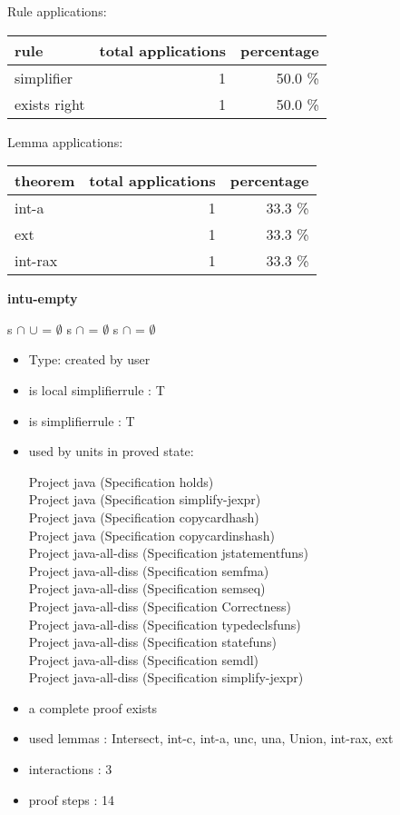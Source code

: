 \documentclass[a4paper]{article}
\begin{document}
Rule applications:

\begin{supertabular}{l|r|r}
rule	        & total applications & percentage \\ \hline
simplifier & 1 & 50.0 \% \\
exists right & 1 & 50.0 \% \\

\end{supertabular}

Lemma applications:

\begin{supertabular}{l|r|r}
theorem	        & total applications & percentage \\ \hline
int-a & 1 & 33.3 \% \\
ext & 1 & 33.3 \% \\
int-rax & 1 & 33.3 \% \\

\end{supertabular}
\pagebreak

{\LARGE\bf intu-empty}\label{lemma-intu-empty}

\medskip

 \Fol s $\cap$  $\cup$  = $\emptyset$ \Equiv s $\cap$  = $\emptyset$ \And s $\cap$  = $\emptyset$

\begin{itemize}

\item Type: created by user

\item is local simplifierrule : T
\item is simplifierrule : T
\item used by units in proved state:

Project java (Specification holds) \\
Project java (Specification simplify-jexpr) \\
Project java (Specification copycardhash) \\
Project java (Specification copycardinshash) \\
Project java-all-diss (Specification jstatementfuns) \\
Project java-all-diss (Specification semfma) \\
Project java-all-diss (Specification semseq) \\
Project java-all-diss (Specification Correctness) \\
Project java-all-diss (Specification typedeclsfuns) \\
Project java-all-diss (Specification statefuns) \\
Project java-all-diss (Specification semdl) \\
Project java-all-diss (Specification simplify-jexpr)
\item       a complete proof exists
\item       used lemmas  : Intersect, int-c, int-a, unc, una, Union, int-rax, ext
\item       interactions : 3
\item       proof steps  : 14
\end{itemize}
\end{document}
